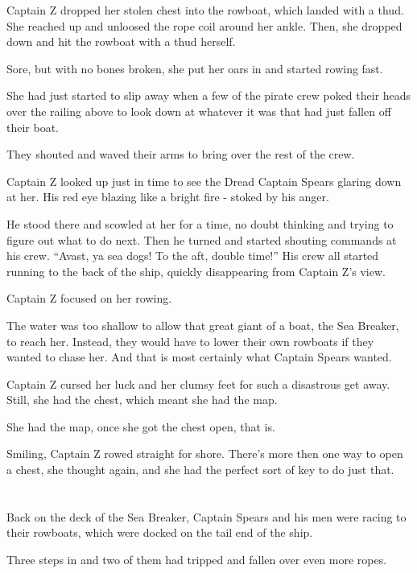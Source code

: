 \documentclass[12pt]{extbook}
\begin{document}
  Captain Z dropped her stolen chest into the rowboat, which landed with a
  thud. She reached up and unloosed the rope coil around her ankle. Then,
  she dropped down and hit the rowboat with a thud herself.
  
  Sore, but with no bones broken, she put her oars in and started rowing
  fast.
  
  She had just started to slip away when a few of the pirate crew poked
  their heads over the railing above to look down at whatever it was that
  had just fallen off their boat.
  
  They shouted and waved their arms to bring over the rest of the crew.
  
  Captain Z looked up just in time to see the Dread Captain Spears glaring
  down at her. His red eye blazing like a bright fire - stoked by his
  anger.
  
  He stood there and scowled at her for a time, no doubt thinking and
  trying to figure out what to do next. Then he turned and started
  shouting commands at his crew. \enquote{Avast, ya sea dogs! To the aft,
  double time!} His crew all started running to the back of the ship,
  quickly disappearing from Captain Z's view.
  
  Captain Z focused on her rowing.
  
  The water was too shallow to allow that great giant of a boat, the Sea
  Breaker, to reach her. Instead, they would have to lower their own
  rowboats if they wanted to chase her. And that is most certainly what
  Captain Spears wanted.
  
  Captain Z cursed her luck and her clumsy feet for such a disastrous get
  away. Still, she had the chest, which meant she had the map.
  
  She had the map, once she got the chest open, that is.
  
  Smiling, Captain Z rowed straight for shore. There's more then one way
  to open a chest, she thought again, and she had the perfect sort of key
  to do just that.
  
  \section{}\label{section-8}
  
  Back on the deck of the Sea Breaker, Captain Spears and his men were
  racing to their rowboats, which were docked on the tail end of the ship.
  
  Three steps in and two of them had tripped and fallen over even more
  ropes.
  
\end{document}
